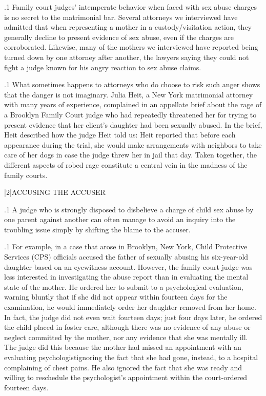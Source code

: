 \documentclass[11pt, twoside]{article}
\begin{document}
{\p.1{%
Family court judges’ intemperate behavior when faced with sex abuse
charges is no secret to the matrimonial bar. Several attorneys we interviewed have admitted that when representing a mother in a custody/visitation action, they generally decline to present evidence of sex
abuse, even if the charges are corroborated. Likewise, many of the mothers we interviewed have reported being turned down by one attorney
after another, the lawyers saying they could not fight a judge known for
his angry reaction to sex abuse claims.
}%

\p.1{%
What sometimes happens to attorneys who do choose to risk such
anger shows that the danger is not imaginary. Julia Heit, a New York
matrimonial attorney with many years of experience, complained in an
appellate brief about the rage of a Brooklyn Family Court judge who had
repeatedly threatened her for trying to present evidence that her client’s
daughter had been sexually abused. In the brief, Heit described how the
judge  Heit told us:  Heit reported that before each appearance during
the trial, she would make arrangements with neighbors to take care of
her dogs in case the judge threw her in jail that day.
Taken together, the different aspects of robed rage constitute a central
vein in the madness of the family courts.
}%


\s|2|{ACCUSING THE ACCUSER}

\p.1{%
\noindent{}A judge who is strongly disposed to disbelieve a charge of child sex abuse
by one parent against another can often manage to avoid an inquiry into
the troubling issue simply by shifting the blame to the accuser.
}%

\p.1{%
For example, in a case that arose in Brooklyn, New York, Child Protective Services (CPS) officials accused the father of sexually abusing
his six-year-old daughter based on an eyewitness account. However, the
family court judge was less interested in investigating the abuse report
than in evaluating the mental state of the mother. He ordered her to
submit to a psychological evaluation, warning bluntly that if she did not
appear within fourteen days for the examination, he would immediately
order her daughter removed from her home. In fact, the judge did not
even wait fourteen days; just four days later, he ordered the child placed
in foster care, although there was no evidence of any abuse or neglect
committed by the mother, nor any evidence that she was mentally ill.
The judge did this because the mother had missed an appointment with
an evaluating psychologist\mdash{}ignoring the fact that she had gone, instead,
to a hospital complaining of chest pains. He also ignored the fact that
she was ready and willing to reschedule the psychologist’s appointment
within the court-ordered fourteen days.
}%

}
\end{document}
